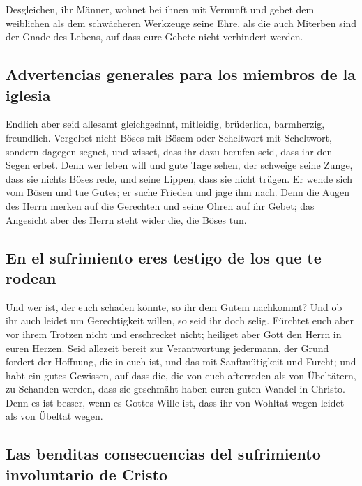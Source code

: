  Desgleichen, ihr Männer, wohnet bei ihnen mit Vernunft
und gebet dem weiblichen als dem schwächeren Werkzeuge seine Ehre, als
die auch Miterben sind der Gnade des Lebens, auf dass eure Gebete nicht
verhindert werden.

\hypertarget{advertencias-generales-para-los-miembros-de-la-iglesia}{%
\subsection{Advertencias generales para los miembros de la
iglesia}\label{advertencias-generales-para-los-miembros-de-la-iglesia}}

 Endlich aber seid allesamt gleichgesinnt, mitleidig,
brüderlich, barmherzig, freundlich.  Vergeltet nicht Böses
mit Bösem oder Scheltwort mit Scheltwort, sondern dagegen segnet, und
wisset, dass ihr dazu berufen seid, dass ihr den Segen erbet.
 Denn wer leben will und gute Tage sehen, der schweige
seine Zunge, dass sie nichts Böses rede, und seine Lippen, dass sie
nicht trügen.  Er wende sich vom Bösen und tue Gutes; er
suche Frieden und jage ihm nach.  Denn die Augen des
Herrn merken auf die Gerechten und seine Ohren auf ihr Gebet; das
Angesicht aber des Herrn steht wider die, die Böses tun.

\hypertarget{en-el-sufrimiento-eres-testigo-de-los-que-te-rodean}{%
\subsection{En el sufrimiento eres testigo de los que te
rodean}\label{en-el-sufrimiento-eres-testigo-de-los-que-te-rodean}}

 Und wer ist, der euch schaden könnte, so ihr dem Gutem
nachkommt?  Und ob ihr auch leidet um Gerechtigkeit
willen, so seid ihr doch selig. Fürchtet euch aber vor ihrem Trotzen
nicht und erschrecket nicht;  heiliget aber Gott den
Herrn in euren Herzen. Seid allezeit bereit zur Verantwortung jedermann,
der Grund fordert der Hoffnung, die in euch ist,  und das
mit Sanftmütigkeit und Furcht; und habt ein gutes Gewissen, auf dass
die, die von euch afterreden als von Übeltätern, zu Schanden werden,
dass sie geschmäht haben euren guten Wandel in Christo. 
Denn es ist besser, wenn es Gottes Wille ist, dass ihr von Wohltat wegen
leidet als von Übeltat wegen.

\hypertarget{las-benditas-consecuencias-del-sufrimiento-involuntario-de-cristo}{%
\subsection{Las benditas consecuencias del sufrimiento involuntario de
Cristo}\label{las-benditas-consecuencias-del-sufrimiento-involuntario-de-cristo}}

